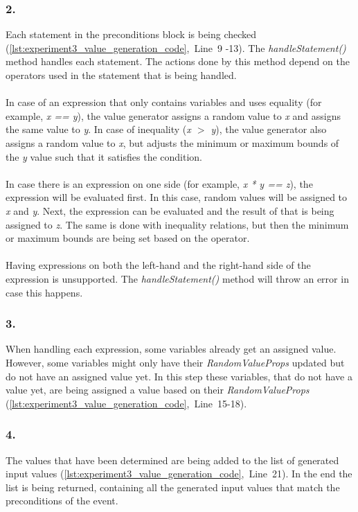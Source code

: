 \subsubsection{2. }
Each statement in the preconditions block is being checked (\autoref{lst:experiment3_value_generation_code},~Line~9 -13). The \textit{handleStatement()} method handles each statement. The actions done by this method depend on the operators used in the statement that is being handled.\\
\\
In case of an expression that only contains variables and uses equality (for example, \textit{x == y}), the value generator assigns a random value to \textit{x} and assigns the same value to \textit{y}. In case of inequality (\textit{x $>$ y}), the value generator also assigns a random value to \textit{x}, but adjusts the minimum or maximum bounds of the \textit{y} value such that it satisfies the condition.\\
\\
In case there is an expression on one side (for example, \textit{x * y == z}), the expression will be evaluated first. In this case, random values will be assigned to \textit{x} and \textit{y}. Next, the expression can be evaluated and the result of that is being assigned to \textit{z}. The same is done with inequality relations, but then the minimum or maximum bounds are being set based on the operator.\\
\\
Having expressions on both the left-hand and the right-hand side of the expression is unsupported. The \textit{handleStatement()} method will throw an error in case this happens.

\subsubsection{3. }
When handling each expression, some variables already get an assigned value. However, some variables might only have their \textit{RandomValueProps} updated but do not have an assigned value yet. In this step these variables, that do not have a value yet, are being assigned a value based on their \textit{RandomValueProps} (\autoref{lst:experiment3_value_generation_code},~Line~15-18).

\subsubsection{4. }
The values that have been determined are being added to the list of generated input values (\autoref{lst:experiment3_value_generation_code},~Line~21). In the end the list is being returned, containing all the generated input values that match the preconditions of the event.

